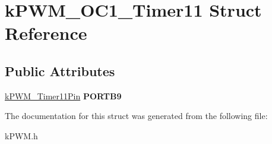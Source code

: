 \hypertarget{structkPWM__OC1__Timer11}{}\section{k\+P\+W\+M\+\_\+\+O\+C1\+\_\+\+Timer11 Struct Reference}
\label{structkPWM__OC1__Timer11}
\subsection*{Public Attributes}
\begin{DoxyCompactItemize}
\item 
\hyperlink{structkPWM__Timer11Pin}{k\+P\+W\+M\+\_\+\+Timer11\+Pin} {\bfseries P\+O\+R\+T\+B9}\hypertarget{structkPWM__OC1__Timer11_a2018f287c3e8e52bcec85f434d521ba7}{}\label{structkPWM__OC1__Timer11_a2018f287c3e8e52bcec85f434d521ba7}

\end{DoxyCompactItemize}


The documentation for this struct was generated from the following file\+:\begin{DoxyCompactItemize}
\item 
k\+P\+W\+M.\+h\end{DoxyCompactItemize}
